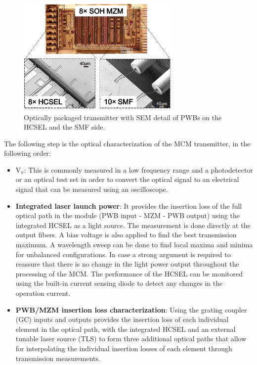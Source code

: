 \begin{figure}[!ht]
\centering
  \includegraphics[width=0.7\textwidth]{lab/optTX_v3}
  \caption{Optically packaged transmitter with SEM detail of PWBs on the HCSEL and the SMF side.}
  \label{fig:optTX}
\end{figure}

The following step is the optical characterization of the MCM transmitter, in the following order:

\begin{itemize}
\item \textbf{$\text{V}_\pi$}: This is commonly measured in a low frequency range and a photodetector or an optical test set in order to convert the optical signal to an electrical signal that can be measured using an oscilloscope. 
\item \textbf{Integrated laser launch power}: It provides the insertion loss of the full optical path in the module (PWB input - MZM - PWB output) using the integrated HCSEL as a light source. The measurement is done directly at the output fibers. A bias voltage is also applied to find the best transmission maximum. A wavelength sweep can be done to find local maxima and minima for unbalanced configurations. In case a strong argument is required to reassure that there is no change in the light power output throughout the processing of the MCM. The performance of the HCSEL can be monitored using the built-in current sensing diode to detect any changes in the operation current. 
\item \textbf{PWB/MZM insertion loss characterization}: Using the grating coupler (GC) inputs and outputs provides the insertion loss of each individual element in the optical path, with the integrated HCSEL and an external tunable laser source (TLS) to form three additional optical paths that allow for interpolating the individual insertion losses of each element through transmission measurements.
\end{itemize}

